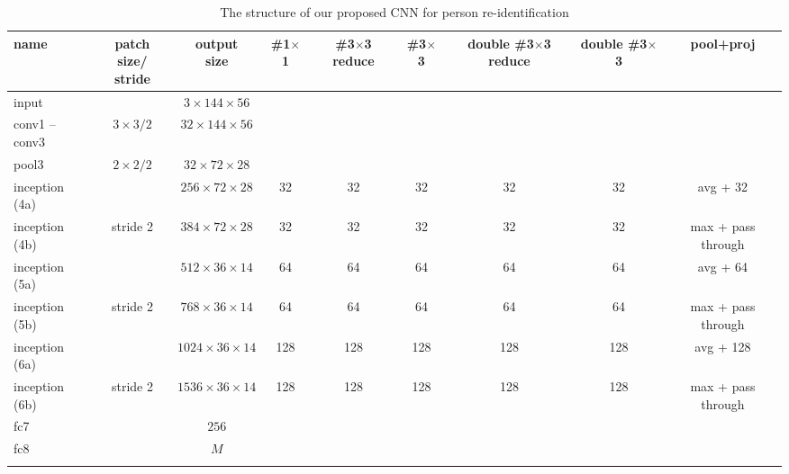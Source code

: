 \begin{table}[t]
\begin{center}
\begin{tabular}{|l|c|c|c|c|c|c|c|c|}
\hline
name & \specialcell{patch size/\\stride} & \specialcell{output\\size} & \#1$\times$1 & \specialcell{\#3$\times$3\\reduce} & \#3$\times$3 & \specialcell{double \#3$\times$3\\reduce} & \specialcell{double\\\#3$\times$3} & pool+proj \\
\hline\hline
input & & $3\times 144\times 56$ & & & & & & \\
\hline
conv1 -- conv3 & $3\times 3/2$ & $32\times 144\times 56$ & & & & & & \\
\hline
pool3 & $2\times 2/2$ & $32\times 72\times 28$ & & & & & & \\
\hline
inception (4a) & & $256\times 72\times 28$ & 32 & 32 & 32 & 32 & 32 & avg + 32 \\
\hline
inception (4b) & stride 2 & $384\times 72\times 28$ & 32 & 32 & 32 & 32 & 32 & max + pass through \\
\hline
inception (5a) & & $512\times 36\times 14$ & 64 & 64 & 64 & 64 & 64 & avg + 64 \\
\hline
inception (5b) & stride 2 & $768\times 36\times 14$ & 64 & 64 & 64 & 64 & 64 & max + pass through \\
\hline
inception (6a) & & $1024\times 36\times 14$ & 128 & 128 & 128 & 128 & 128 & avg + 128 \\
\hline
inception (6b) & stride 2 & $1536\times 36\times 14$ & 128 & 128 & 128 & 128 & 128 & max + pass through \\
\hline
fc7 & & $256$ & & & & & & \\
\hline
fc8 & & $M$ & & & & & & \\
\hline\noalign{\smallskip}
\end{tabular}
\end{center}
\caption{The structure of our proposed CNN for person re-identification}
\label{tab:cnn_structure}
\end{table}


